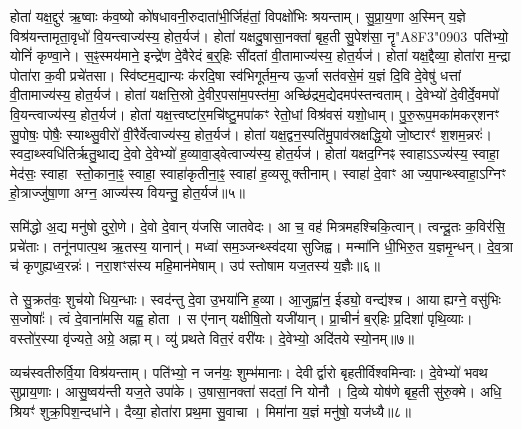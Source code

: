 होता॑ यक्ष॒द्दुर॑ ऋ॒ष्वाः क॑व॒ष्यो को॑षधावनी॒रुदाता॑भी॒र्जिह॑तां॒ विपक्षो॑भिः श्रयन्ताम्।
सु॒प्रा॒य॒णा अ॒स्मिन् य॒ज्ञे विश्र॑यन्तामृता॒वृधो॑ वि॒यन्त्वाज्य॑स्य॒ होत॒र्यज॑।
होता॑ यक्षदु॒षासा॒नक्ता॑ बृह॒ती सु॒पेश॑सा॒ नॄ\char"A8F3\char"0903~पति॑भ्यो॒ योनिं॑ कृण्वा॒ने।
स॒ꣴ॒स्मय॑माने॒ इन्द्रे॑ण दे॒वैरेदं ब॒र्॒हिः सी॑दतां वी॒तामाज्य॑स्य॒ होत॒र्यज॑।
होता॑ यक्ष॒द्दैव्या॒ होता॑रा म॒न्द्रा पोता॑रा क॒वी प्रचे॑तसा।
स्वि॑ष्टम॒द्यान्यः क॑रदि॒षा स्व॑भिगूर्तम॒न्य ऊ॒र्जा सत॑वसे॒मं य॒ज्ञं दि॒वि दे॒वेषु॑ धत्तां वी॒तामाज्य॑स्य॒ होत॒र्यज॑।
होता॑ यक्षत्ति॒स्रो दे॒वीर॒पसा॑म॒पस्त॑मा॒ अच्छि॑द्रम॒द्येदमप॑स्तन्वताम्।
दे॒वेभ्यो॑ दे॒वीर्दे॒वमपो॑ वि॒यन्त्वाज्य॑स्य॒ होत॒र्यज॑।
होता॑ यक्ष॒त्त्वष्टा॑र॒मचि॑ष्टु॒मपा॑कꣳ रेतो॒धां विश्र॑वसं यशो॒धाम्।
पु॒रु॒रूप॒मका॑मकर्‌\mbox{}शनꣳ सु॒पोषः॒ पोषैः॒ स्याथ्सु॒वीरो॑ वी॒रैर्वेत्वाज्य॑स्य॒ होत॒र्यज॑।
होता॑ यक्ष॒द्वन॒स्पति॑मु॒पाव॑स्रक्षद्धि॒यो जो॒ष्टारꣳ॑ श॒शम॒न्नरः॑।
स्वदा॒थ्स्वधि॑तिर्\mbox{}ऋतु॒थाद्य दे॒वो दे॒वेभ्यो॑ ह॒व्यावा॒ड्वेत्वाज्य॑स्य॒ होत॒र्यज॑।
होता॑ यक्षद॒ग्निꣴ स्वाहा\-ऽऽज्य॑स्य॒ स्वाहा॒ मेद॑सः॒ स्वाहा स्तो॒काना॒ꣴ॒ स्वाहा॒ स्वाहा॑कृतीना॒ꣴ॒ स्वाहा॑ ह॒व्यसूक्तीनाम्।
स्वाहा॑ दे॒वाꣳ आज्य॒पान्थ्स्वाहा॒\-ऽग्निꣳ हो॒त्राज्जु॑षा॒णा अग्न॒ आज्य॑स्य वियन्तु॒ होत॒र्यज॑॥५॥

समि॑द्धो अ॒द्य मनु॑षो दुरो॒णे।
दे॒वो दे॒वान् य॑जसि जातवेदः।
आ च॒ वह॑ मित्रमहश्चिकि॒त्वान्।
त्वन्दू॒तः क॒विर॑सि॒ प्रचे॑ताः।
तनू॑नपात्प॒थ ऋ॒तस्य॒ यानान्॑।
मध्वा॑ सम॒ञ्जन्थ्स्व॑दया सुजिह्व।
मन्मा॑नि धी॒भिरु॒त य॒ज्ञमृ॒न्धन्।
दे॒व॒त्रा च॑ कृणुह्यध्व॒रन्नः॑।
नरा॒शꣳस॑स्य महि॒मान॑मेषाम्।
उप॑ स्तोषाम यज॒तस्य॑ य॒ज्ञैः॥६॥

ते सु॒क्रत॑वः॒ शुच॑यो धिय॒न्धाः।
स्वद॑न्तु दे॒वा उ॒भया॑नि ह॒व्या।
आ॒जुह्वा॑न॒ ईड्यो॒ वन्द्य॑श्च।
आयाह्यग्ने॒ वसु॑भिः स॒जोषाः᳚।
त्वं दे॒वाना॑मसि यह्व॒ होता।
स ए॑नान् यक्षीषि॒तो यजी॑यान्।
प्रा॒चीनं॑ ब॒र्‌\mbox{}हिः प्र॒दिशा॑ पृथि॒व्याः।
वस्तो॑र॒स्या वृ॑ज्यते॒ अग्रे॒ अह्नाम्।
व्यु॑ प्रथते वित॒रं वरी॑यः।
दे॒वेभ्यो॒ अदि॑तये स्यो॒नम्॥७॥

व्यच॑स्वतीरुर्वि॒या विश्र॑यन्ताम्।
पति॑भ्यो॒ न जन॑यः॒ शुम्भ॑मानाः।
देवीर्द्वारो बृहतीर्विश्वमिन्वाः।
दे॒वेभ्यो॑ भवथ सुप्राय॒णाः।
आसु॒ष्वय॑न्ती यज॒ते उपा॑के।
उ॒षासा॒नक्ता॑ सदतां॒ नि योनौ।
दि॒व्ये योष॑णे बृह॒ती सु॑रु॒क्मे।
अधि॒ श्रियꣳ॑ शुक्र॒पिश॒न्दधा॑ने।
दैव्या॒ होता॑रा प्रथ॒मा सु॒वाचा।
मिमा॑ना य॒ज्ञं मनु॑षो॒ यज॑ध्यै॥८॥

